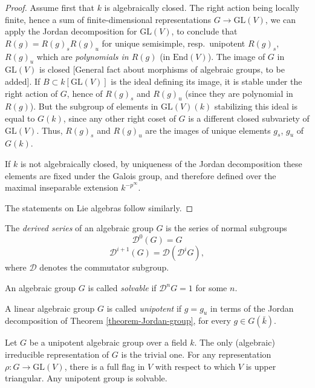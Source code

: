 \begin{proof}
 Assume first that $k$ is algebraically closed. The right action being locally finite, hence a sum of finite-dimensional representations $G\to \text{GL}(V)$, we can apply the Jordan decomposition for $\text{GL}(V)$, to conclude that $R(g) = R(g)_s R(g)_u$ for unique semisimple, resp.\ unipotent $R(g)_s$, $R(g)_u$ which are \emph{polynomials in $R(g)$} (in $\text{End}(V)$). The image of $G$ in $\text{GL}(V)$ is closed [General fact about morphisms of algebraic groups, to be added]. If $B\subset k[\text{GL}(V)]$ is the ideal defining its image, it is stable under the right action of $G$, hence of $R(g)_s$ and $R(g)_u$ (since they are polynomial in $R(g)$). But the subgroup of elements in $\text{GL}(V)(k)$ stabilizing this ideal is equal to $G(k)$, since any other right coset of $G$ is a different closed subvariety of $\text{GL}(V)$. Thus, $R(g)_s$ and $R(g)_u$ are the images of unique elements $g_s$, $g_u$ of $G(k)$.
 
 If $k$ is not algebraically closed, by uniqueness of the Jordan decomposition these elements are fixed under the Galois group, and therefore defined over the maximal inseparable extension $k^{-p^\infty}$.   
 
 The statements on Lie algebras follow similarly. 
\end{proof}


\begin{definition}
 \label{definition-solvable-unipotent}
The {\it derived series} of an algebraic group $G$ is the series of normal subgroups 
$$ \mathcal D^0(G) = G$$
$$ \mathcal D^{i+1}(G) = \mathcal D(\mathcal D^iG),$$
where $\mathcal D$ denotes the commutator subgroup. 

An algebraic group $G$ is called \emph{solvable} if $\mathcal D^n G=1$ for some $n$. 

A linear algebraic group $G$ is called \emph{unipotent} if $g = g_u$ in terms of the Jordan decomposition of Theorem \ref{theorem-Jordan-group}, for every $g\in G(\bar k)$.
\end{definition}

\begin{theorem}
\label{theorem-representations-unipotent}
Let $G$ be a unipotent algebraic group over a field $k$. The only (algebraic) irreducible representation of $G$ is the trivial one. For any representation $\rho:G \to \text{GL}(V)$, there is a full flag in $V$ with respect to which $V$ is upper triangular. Any unipotent group is solvable.
\end{theorem}

